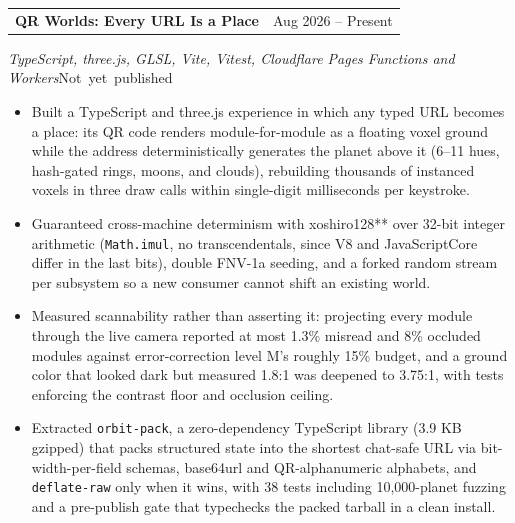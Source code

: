 \documentclass[letterpaper,10pt]{article}
\makeatletter
\newcommand{\EntryGapAfter}{2pt}
\newcommand{\IfEmpty}[3]{\if\relax\detokenize{#1}\relax#2\else#3\fi}
\newcommand{\projectheading}[4]{%
  \Needspace*{4\baselineskip}%
  \begin{tabularx}{\textwidth}{@{}X r@{}}
    \textbf{#1} & #2 \\
  \end{tabularx}\par
  {\textit{#3}\IfEmpty{#4}{}{\hspace*{1.5em plus 1filll}\mbox{\small #4}}}\par
  \nopagebreak\vspace{\EntryGapAfter}%
}
\makeatother
\begin{document}
\projectheading{QR Worlds: Every URL Is a Place}{Aug 2026 -- Present}
{TypeScript, three.js, GLSL, Vite, Vitest, Cloudflare Pages Functions and Workers}{Not yet published}
\begin{itemize}
\item Built a TypeScript and three.js experience in which any typed URL becomes a place: its QR code renders module-for-module as a floating voxel ground while the address deterministically generates the planet above it (6--11 hues, hash-gated rings, moons, and clouds), rebuilding thousands of instanced voxels in three draw calls within single-digit milliseconds per keystroke.
\item Guaranteed cross-machine determinism with xoshiro128** over 32-bit integer arithmetic (\texttt{Math.imul}, no transcendentals, since V8 and JavaScriptCore differ in the last bits), double FNV-1a seeding, and a forked random stream per subsystem so a new consumer cannot shift an existing world.
\item Measured scannability rather than asserting it: projecting every module through the live camera reported at most 1.3\% misread and 8\% occluded modules against error-correction level M's roughly 15\% budget, and a ground color that looked dark but measured 1.8:1 was deepened to 3.75:1, with tests enforcing the contrast floor and occlusion ceiling.
\item Extracted \texttt{orbit-pack}, a zero-dependency TypeScript library (3.9 KB gzipped) that packs structured state into the shortest chat-safe URL via bit-width-per-field schemas, base64url and QR-alphanumeric alphabets, and \texttt{deflate-raw} only when it wins, with 38 tests including 10,000-planet fuzzing and a pre-publish gate that typechecks the packed tarball in a clean install.
\end{itemize}
\end{document}
